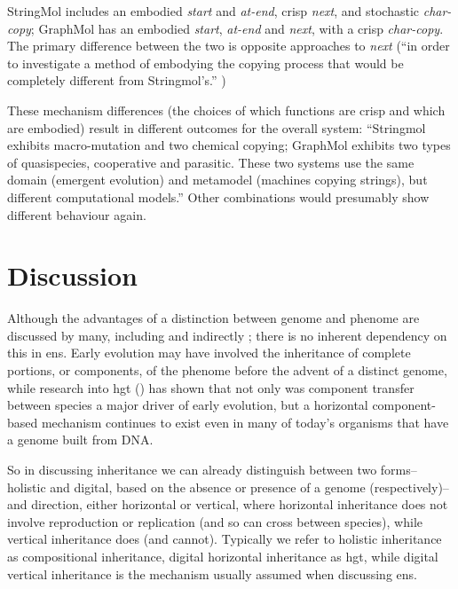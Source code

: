 StringMol includes an embodied \emph{start} and \emph{at-end}, crisp \emph{next}, and stochastic \emph{char-copy}; GraphMol has an embodied \emph{start}, \emph{at-end} and \emph{next}, with a crisp \emph{char-copy}. The primary difference between the two is opposite approaches to \emph{next} (``in order to investigate a method of embodying the copying process that would be completely different from Stringmol's.'' \parencite[p.145]{Nellis2012})

These mechanism differences (the choices of which functions are crisp and which are embodied) result in different outcomes for the overall system: ``Stringmol exhibits macro-mutation and two chemical copying; GraphMol exhibits two types of quasispecies, cooperative and parasitic. These two systems use the same domain (emergent evolution) and metamodel (machines copying strings), but different computational models.'' Other combinations would presumably show different behaviour again.


\section{Discussion}
Although the advantages of a distinction between genome and phenome are discussed by many, including \parencite[section 7.2.3]{Taylor1999} and indirectly \cite{VonNeumann1966}; there is no inherent dependency on this in \gls{ens}. Early evolution may have involved the inheritance of complete portions, or components, of the phenome before the advent of a distinct genome, while research into \gls{hgt} (\eg \cite{Ochman2000,Pace:2008vi,Ragan2009}) has shown that not only was component transfer between species a major driver of early evolution, but a horizontal component-based mechanism continues to exist even in many of today's organisms that have a genome built from DNA. 

So in discussing inheritance we can already distinguish between two forms--holistic and digital, based on the absence or presence of a genome (respectively)--and direction, either horizontal or vertical, where horizontal inheritance does not involve reproduction or replication (and so can cross between species), while vertical inheritance does (and cannot). Typically we refer to holistic inheritance as compositional inheritance, digital horizontal inheritance as \gls{hgt},  while digital vertical inheritance is the mechanism usually assumed when discussing \gls{ens}.

